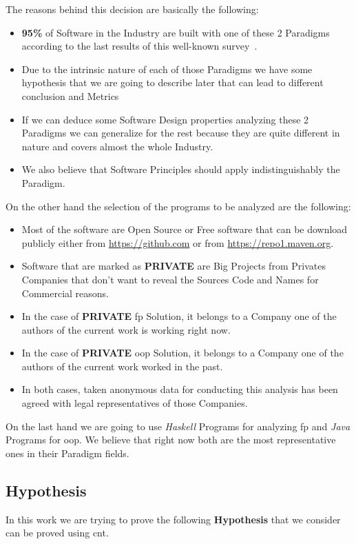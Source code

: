 \documentclass[12pt, a4paper]{article}
\begin{document}
The reasons behind this decision are basically the following:

\begin{itemize}
    \item \textbf{95\%} of Software in the Industry are built with one of these 2 Paradigms according to the last results of this well-known survey~\cite{so_survey}.
    \item Due to the intrinsic nature of each of those Paradigms we have some hypothesis that we are going to describe later that can lead to different conclusion and Metrics
    \item If we can deduce some Software Design properties analyzing these 2 Paradigms we can generalize for the rest because they are quite different in nature and covers almost the whole Industry.
    \item We also believe that Software Principles should apply indistinguishably the Paradigm. 
\end{itemize}

On the other hand the selection of the programs to be analyzed are the following:

\begin{itemize}
    \item Most of the software are Open Source or Free software that can be download publicly either from \url{https://github.com} or from \url{https://repo1.maven.org}.
    \item Software that are marked as \textbf{PRIVATE} are Big Projects from Privates Companies that don't want to reveal the Sources Code and Names for Commercial reasons.
    \item In the case of \textbf{PRIVATE} \acrshort{fp} Solution, it belongs to a Company one of the authors of the current work is working right now.
    \item In the case of \textbf{PRIVATE} \acrshort{oop} Solution, it belongs to a Company one of the authors of the current work worked in the past.
    \item In both cases, taken anonymous data for conducting this analysis has been agreed with legal representatives of those Companies.
\end{itemize}

On the last hand we are going to use \textit{Haskell} Programs for analyzing \acrlong{fp} and \textit{Java} Programs for \acrlong{oop}. We believe that right now both are the most representative
ones in their Paradigm fields.

\subsection{Hypothesis}
In this work we are trying to prove the following \textbf{Hypothesis} that we consider can be proved using \acrfull{cnt}.
\end{document}
